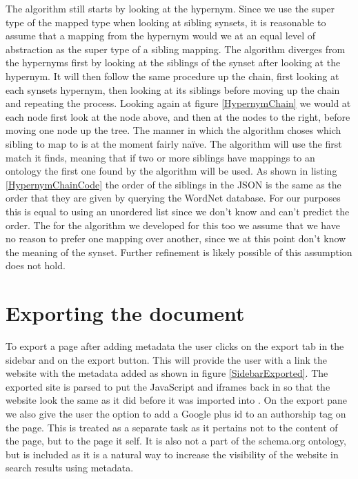 The algorithm still starts by looking at the hypernym.
Since we use the super type of the mapped type when looking at sibling synsets,
it is reasonable to assume that a mapping from the hypernym would we at an equal level of abstraction as the
super type of a sibling mapping.
The algorithm diverges from the hypernyms first by looking at the siblings of the synset after looking at the hypernym.
It will then follow the same procedure up the chain, first looking at each synsets hypernym,
then looking at its siblings before moving up the chain and repeating the process.
Looking again at figure \ref{HypernymChain} we would at each node first look at the node above,
and then at the nodes to the right, before moving one node up the tree.
The manner in which the algorithm choses which sibling to map to is at the moment fairly naïve.
The algorithm will use the first match it finds,
meaning that if two or more siblings have mappings to an ontology the first one found by the algorithm will be used.
As shown in listing \ref{HypernymChainCode} the order of the siblings in the JSON is the same as the order that they
are given by querying the WordNet database.
For our purposes this is equal to using an unordered list since we don't know and can't predict the order.
The for the algorithm we developed for this too we assume  that we have no reason to prefer one mapping over another,
since we at this point don't know the meaning of the synset.
Further refinement is likely possible of this assumption does not hold.

\section{Exporting the document}
To export a page after adding metadata the user clicks on the export tab in the sidebar and on the export button.
This will provide the user with a link the website with the metadata added as shown in figure \ref{SidebarExported}.
The exported site is parsed to put the JavaScript and iframes back in so that the website look the same as it did
before it was imported into \theartefact.
On the export pane we also give the user the option to add a Google plus id to an authorship tag on the page.
This is treated as a separate task as it pertains not to the content of the page, but to the page it self.
It is also not a part of the schema.org ontology, but is included as it is a natural way to increase the visibility of
the website in search results using metadata.

